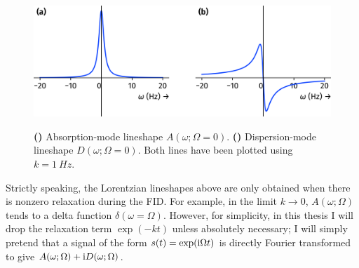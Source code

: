 \begin{figure}[ht]
    \centering
    \includegraphics[scale=0.7]{./figures/lorentzians.png}
    {\label{fig:lorentzians_absorption}}
    {\label{fig:lorentzians_dispersion}}
    \caption[Absorption- and dispersion-mode Lorentzian lineshapes]{
        \textbf{()} Absorption-mode lineshape $A(\omega; \Omega = 0)$.
        \textbf{()} Dispersion-mode lineshape $D(\omega; \Omega = 0)$.
        Both lines have been plotted using $k = \SI{1}{Hz}$.
    }
    \label{fig:lorentzians}
\end{figure}

Strictly speaking, the Lorentzian lineshapes above are only obtained when there is nonzero relaxation during the FID.
For example, in the limit $k \to 0$, $A(\omega; \Omega)$ tends to a delta function $\delta(\omega = \Omega)$.
However, for simplicity, in this thesis I will drop the relaxation term $\exp(-kt)$ unless absolutely necessary; I will simply pretend that a signal of the form $s(t) = \exp(\mathrm{i} \Omega t)$ is directly Fourier transformed to give $A(\omega; \Omega) + \mathrm{i} D(\omega; \Omega)$.

